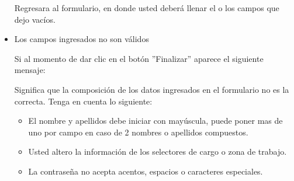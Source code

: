 \begin{itemize}
                           Regresara  al formulario, en donde usted deberá llenar el o los campos que dejo vacíos. 
                
                        \item Los campos ingresados no son válidos
                        
                            Si al momento de dar clic en el botón ''Finalizar'' aparece el siguiente mensaje:
                            
                            Significa que la composición de los datos ingresados en el formulario no es la correcta. Tenga en cuenta lo siguiente:
                            
                            \begin{itemize}
                            	\item El nombre y apellidos debe iniciar con mayúscula, puede poner mas de uno por campo en caso de 2 nombres o apellidos compuestos.
                            	\item Usted altero la información de los selectores de cargo o zona de trabajo.
                            	\item La contraseña no acepta acentos, espacios o caracteres especiales.
                            \end{itemize}
                        
                        
                    
                    \end{itemize}